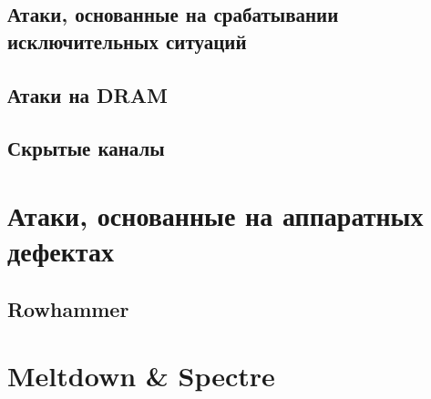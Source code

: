 \documentclass[final, xcolor = table, usenames, dvipsnames, table, aspectratio = 169]{beamer}
\begin{document}
\subsection{Атаки, основанные на срабатывании исключительных ситуаций}


\subsection{Атаки на DRAM}


\subsection{Скрытые каналы}



\section{Атаки, основанные на аппаратных дефектах}


\subsection{Rowhammer}



\section{Meltdown \& Spectre}
% 


% 

% 
\end{document}
